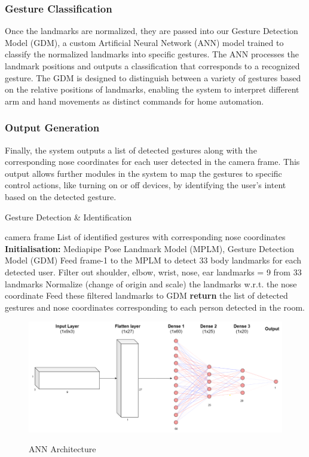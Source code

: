 \subsubsection{Gesture Classification}
Once the landmarks are normalized, they are passed into our Gesture Detection Model (GDM), a custom Artificial Neural Network (ANN) model trained to classify the normalized landmarks into specific gestures. The ANN processes the landmark positions and outputs a classification that corresponds to a recognized gesture. The GDM is designed to distinguish between a variety of gestures based on the relative positions of landmarks, enabling the system to interpret different arm and hand movements as distinct commands for home automation.

\subsubsection{Output Generation}
Finally, the system outputs a list of detected gestures along with the corresponding nose coordinates for each user detected in the camera frame. This output allows further modules in the system to map the gestures to specific control actions, like turning on or off devices, by identifying the user's intent based on the detected gesture.

\begin{algorithm}[H]
	\caption{Gesture Detection \& Identification}
	\label{alg:GestureDetection}
	\begin{algorithmic}[1]
		 camera frame
		\Ensure List of identified gestures with corresponding nose coordinates
		\State \textbf{Initialisation:} Mediapipe Pose Landmark Model (MPLM), Gesture Detection Model (GDM)
		\State Feed frame-1 to the MPLM to detect 33 body landmarks for each detected user.
		\State Filter out shoulder, elbow, wrist, nose, ear landmarks = 9 from 33 landmarks
		\State Normalize (change of origin and scale) the landmarks w.r.t. the nose coordinate
		\State Feed these filtered landmarks to GDM
		\State \textbf{return} the list of detected gestures and nose coordinates corresponding to each person detected in the room.
	\end{algorithmic}
\end{algorithm}


\begin{figure}[!t]
	\centering
	\includegraphics[scale=1]{images/ann_architecture.png} \\
	\caption{ANN Architecture }
	\label{fig: ANN Architecture }
\end{figure}
\clearpage


